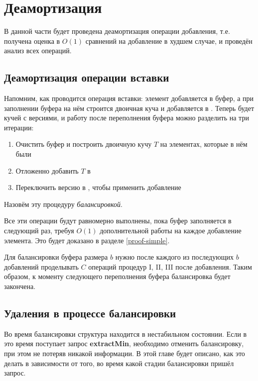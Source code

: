 \section{Деамортизация}
В данной части будет проведена деамортизация операции добавления, т.е. получена
оценка в $O(1)$ сравнений на добавление в худшем случае, и проведён анализ всех
операций.



\subsection{Деамортизация операции вставки}

Напомним, как проводится операция вставки: элемент добавляется в буфер,
а при заполнении буфера на нём строится двоичная куча и добавляется в
\MH. Теперь \MH будет кучей с версиями, и работу после переполнения буфера
можно разделить на три итерации:
\begin{enumerate}[label=\Roman*.]
\item Очистить буфер и построить двоичную кучу $T$ на элементах, которые в нём были
\item Отложенно добавить $T$ в \MH
\item Переключить версию в \MH, чтобы применить добавление
\end{enumerate}
Назовём эту процедуру \emph{балансировкой}.

Все эти операции будут равномерно выполнены, пока буфер заполняется в следующий
раз, требуя $O(1)$ дополнительной работы на каждое добавление элемента.
Это будет доказано в разделе \ref{proof-simple}.

Для балансировки буфера размера $b$ нужно после каждого из последующих $b$
добавлений проделывать $C$ операций процедур I, II, III после добавления.
Таким образом, к моменту следующего переполнения буфера балансировка будет закончена.

\subsection{Удаления в процессе балансировки}

Во время балансировки структура находится в нестабильном состоянии. Если
в это время поступает запрос \textbf{extractMin}, необходимо отменить балансировку,
при этом не потеряв никакой информации. В этой главе будет описано, как это делать
в зависимости от того, во время какой стадии балансировки пришёл запрос.


